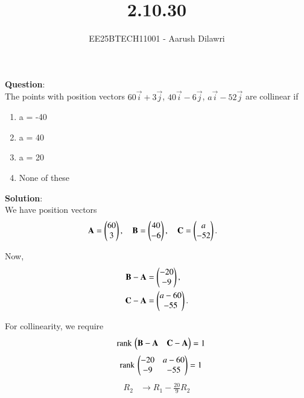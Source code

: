 \documentclass[journal]{IEEEtran}
\begin{document}

\vspace{3cm}

\title{2.10.30}
\author{EE25BTECH11001 - Aarush Dilawri}
{\let\newpage\relax\maketitle}

\renewcommand{\thefigure}{\theenumi}
\renewcommand{\thetable}{\theenumi}
\setlength{\intextsep}{10pt} %
\textbf{Question}:\\
The points with position vectors $60\vec{i} + 3\vec{j}$, $40\vec{i} - 6\vec{j}$, $a\vec{i} - 52\vec{j}$ are collinear if\\
\begin{multicols}{2}
\begin{enumerate}[label=(\alph*)]
    \item  a = -40
    \item  a = 40
    \item  a = 20
    \item  None of these
\end{enumerate}
\end{multicols}
\textbf{Solution}:\\
We have position vectors
\begin{align}
\mathbf{A} &= \begin{pmatrix}60 \\ 3\end{pmatrix}, \quad 
\mathbf{B} = \begin{pmatrix}40 \\ -6\end{pmatrix}, \quad 
\mathbf{C} = \begin{pmatrix}a \\ -52\end{pmatrix}.
\end{align}

Now,
\begin{align}
\mathbf{B} - \mathbf{A} &= \begin{pmatrix}-20 \\ -9\end{pmatrix}, \\
\mathbf{C} - \mathbf{A} &= \begin{pmatrix}a-60 \\ -55\end{pmatrix}.
\end{align}

For collinearity, we require
\begin{align}
    \quad \text{rank}\,\begin{pmatrix}\mathbf{B}-\mathbf{A} & \mathbf{C}-\mathbf{A}\end{pmatrix} = 1
\end{align}
\begin{align}
    \quad \text{rank}\,\begin{pmatrix}-20 & a-60 \\ -9 & -55\end{pmatrix} = 1
\end{align}
\begin{align}
R_2 &\to R_1 - \tfrac{20}{9}R_2
\end{align}
\end{document}
